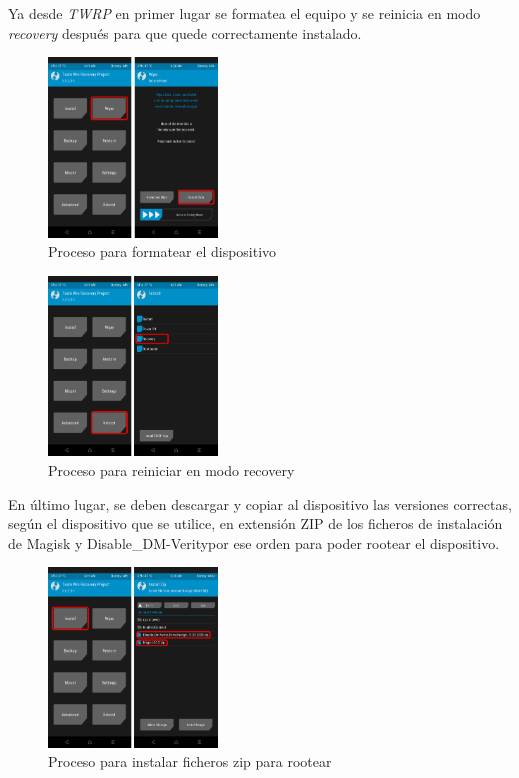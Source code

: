 \documentclass[12pt,a4paper,onecolumn,oneside]{report}
\begin{document}
Ya desde \textit{TWRP} en primer lugar se formatea el equipo y se reinicia en modo \textit{recovery} después para que quede correctamente instalado.

\begin{figure}[h] 
\centering
  \includegraphics[width=0.4\textwidth]{figuras/root52.png}
  \caption[Proceso para formatear el dispositivo]{Proceso para formatear el dispositivo\\
  }
  \label{fig:root52}
\end{figure}

\begin{figure}[h] 
\centering
  \includegraphics[width=0.4\textwidth]{figuras/root53.png}
  \caption[Proceso para reiniciar en modo recovery]{Proceso para reiniciar en modo recovery\\
  }
  \label{fig:root53}
\end{figure}


En último lugar, se deben descargar y copiar al dispositivo las versiones correctas, según el dispositivo que se utilice, en extensión ZIP de los ficheros de instalación de Magisk y Disable\_DM-Veritypor ese orden  para poder rootear el dispositivo.

\begin{figure}[h] 
\centering
  \includegraphics[width=0.4\textwidth]{figuras/root54.png}
  \caption[Proceso para instalar ficheros zip para rootear]{Proceso para instalar ficheros zip para rootear\\
  }
  \label{fig:root54}
\end{figure}
\end{document}

